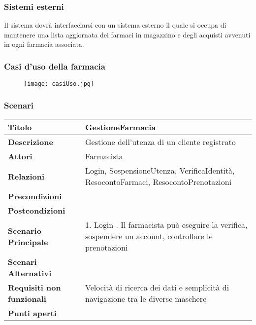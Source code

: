 \subsubsection{Sistemi esterni}

Il sistema dovrà interfacciarsi con un sistema esterno il quale si occupa di
mantenere una lista aggiornata dei farmaci in magazzino e degli
acquisti avvenuti in ogni farmacia associata.


\newpage %
\subsubsection{Casi d'uso della farmacia}

\begin{figure}[h!]
  \begin{center}
      \texttt{[image: casiUso.jpg]}
  \end{center}
\end{figure}

\newpage %
\subsubsection{Scenari}
\hfill \break

\begin{tabular} {|P{4.5cm}|P{12.5cm}|}
\hline  
  \textbf{Titolo} & GestioneFarmacia \\
\hline
  \textbf{Descrizione} & Gestione dell'utenza di un cliente registrato \\
\hline
  \textbf{Attori} & Farmacista\\
\hline
  \textbf{Relazioni} & Login, SospensioneUtenza, VerificaIdentità, ResocontoFarmaci, ResocontoPrenotazioni\\
\hline
  \textbf{Precondizioni} & \\
\hline
  \textbf{Postcondizioni} & \\
\hline
  \textbf{Scenario Principale} & 1. Login . Il farmacista può eseguire la verifica, sospendere un account, controllare le prenotazioni \\
\hline
  \textbf{Scenari Alternativi} &\\
\hline
  \textbf{Requisiti non funzionali} & Velocità di ricerca dei dati e semplicità di navigazione tra le diverse maschere\\
\hline
  \textbf{Punti aperti} &\\
\hline
\end{tabular}
\hfill
\break

